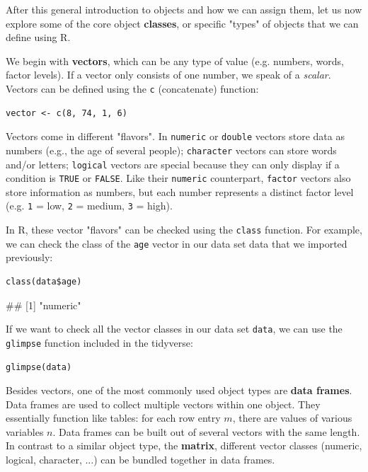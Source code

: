 After this general introduction to objects and how we can assign them, let us now explore some of the core object \textbf{classes}, or specific "types" of objects that we can define using \textsf{R}.

We begin with \textbf{vectors}, which can be any type of value (e.g. numbers, words, factor levels). If a vector only consists of one number, we speak of a \emph{scalar}. Vectors can be defined using the \texttt{c} (concatenate) function:

\begin{lstlisting}
vector <- c(8, 74, 1, 6)
\end{lstlisting}

Vectors come in different "flavors". In \texttt{numeric} or \texttt{double} vectors store data as numbers (e.g., the age of several people); \texttt{character} vectors can store words and/or letters; \texttt{logical} vectors are special because they can only display if a condition is \texttt{TRUE} or \texttt{FALSE}. Like their \texttt{numeric} counterpart, \texttt{factor} vectors also store information as numbers, but each number represents a distinct factor level (e.g. \texttt{1} = low, \texttt{2} = medium, \texttt{3} = high).

In \textsf{R}, these vector "flavors" can be checked using the \texttt{class} function. For example, we can check the class of the \texttt{age} vector in our data set \textsf{data} that we imported previously:

\begin{lstlisting}
class(data$age)
\end{lstlisting}
\begin{example}
## [1] "numeric"
\end{example}

If we want to check all the vector classes in our data set \texttt{data}, we can use the \texttt{glimpse} function included in the tidyverse:

\begin{lstlisting}
glimpse(data)
\end{lstlisting}

Besides vectors, one of the most commonly used object types are \textbf{data frames}. Data frames are used to collect multiple vectors within one object. They essentially function like tables: for each row entry $m$, there are values of various variables $n$. Data frames can be built out of several vectors with the same length. In contrast to a similar object type, the \textbf{matrix}, different vector classes (numeric, logical, character, ...) can be bundled together in data frames. 

